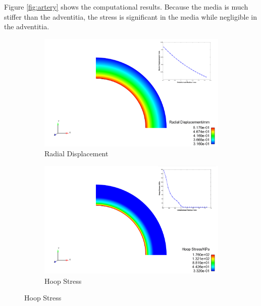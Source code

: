 Figure \ref{fig:artery} shows the computational results. Because the media is much stiffer than the adventitia, the stress is significant in the media while negligible in the adventitia.

\begin{figure}[H]
	\begin{subfigure}[b]{0.5\textwidth}
		\centering
		\includegraphics[width=\textwidth]{./figures/artery_ur.png}
		\caption{Radial Displacement}
		\label{ur_artery}
	\end{subfigure}
	\begin{subfigure}[b]{0.5\textwidth}
		\centering
		\includegraphics[width=\textwidth]{./figures/artery_hoop.png}
		\caption{Hoop Stress}
		\label{hoop_artery}
	\end{subfigure}
	

\end{figure}
